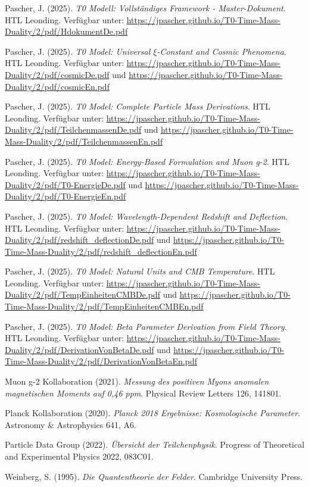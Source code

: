 \documentclass[12pt,a4paper]{report}
\begin{document}
	\begin{thebibliography}{99}
		Pascher, J. (2025). \textit{T0 Modell: Vollständiges Framework - Master-Dokument}. HTL Leonding. Verfügbar unter: \url{https://jpascher.github.io/T0-Time-Mass-Duality/2/pdf/HdokumentDe.pdf}
		
		Pascher, J. (2025). \textit{T0 Model: Universal $\xi$-Constant and Cosmic Phenomena}. HTL Leonding. Verfügbar unter: \url{https://jpascher.github.io/T0-Time-Mass-Duality/2/pdf/cosmicDe.pdf} und \url{https://jpascher.github.io/T0-Time-Mass-Duality/2/pdf/cosmicEn.pdf}
		
		Pascher, J. (2025). \textit{T0 Model: Complete Particle Mass Derivations}. HTL Leonding. Verfügbar unter: \url{https://jpascher.github.io/T0-Time-Mass-Duality/2/pdf/TeilchenmassenDe.pdf} und \url{https://jpascher.github.io/T0-Time-Mass-Duality/2/pdf/TeilchenmassenEn.pdf}
		
		Pascher, J. (2025). \textit{T0 Model: Energy-Based Formulation and Muon g-2}. HTL Leonding. Verfügbar unter: \url{https://jpascher.github.io/T0-Time-Mass-Duality/2/pdf/T0-EnergieDe.pdf} und \url{https://jpascher.github.io/T0-Time-Mass-Duality/2/pdf/T0-EnergieEn.pdf}
		
		Pascher, J. (2025). \textit{T0 Model: Wavelength-Dependent Redshift and Deflection}. HTL Leonding. Verfügbar unter: \url{https://jpascher.github.io/T0-Time-Mass-Duality/2/pdf/redshift_deflectionDe.pdf} und \url{https://jpascher.github.io/T0-Time-Mass-Duality/2/pdf/redshift_deflectionEn.pdf}
		
		Pascher, J. (2025). \textit{T0 Model: Natural Units and CMB Temperature}. HTL Leonding. Verfügbar unter: \url{https://jpascher.github.io/T0-Time-Mass-Duality/2/pdf/TempEinheitenCMBDe.pdf} und \url{https://jpascher.github.io/T0-Time-Mass-Duality/2/pdf/TempEinheitenCMBEn.pdf}
		
		Pascher, J. (2025). \textit{T0 Model: Beta Parameter Derivation from Field Theory}. HTL Leonding. Verfügbar unter: \url{https://jpascher.github.io/T0-Time-Mass-Duality/2/pdf/DerivationVonBetaDe.pdf} und \url{https://jpascher.github.io/T0-Time-Mass-Duality/2/pdf/DerivationVonBetaEn.pdf}
		
		Muon g-2 Kollaboration (2021). \textit{Messung des positiven Myons anomalen magnetischen Moments auf 0,46 ppm}. Physical Review Letters 126, 141801.
		
		Planck Kollaboration (2020). \textit{Planck 2018 Ergebnisse: Kosmologische Parameter}. Astronomy \& Astrophysics 641, A6.
		
		Particle Data Group (2022). \textit{Übersicht der Teilchenphysik}. Progress of Theoretical and Experimental Physics 2022, 083C01.
		
		Weinberg, S. (1995). \textit{Die Quantentheorie der Felder}. Cambridge University Press.
	\end{thebibliography}
	
\end{document}

